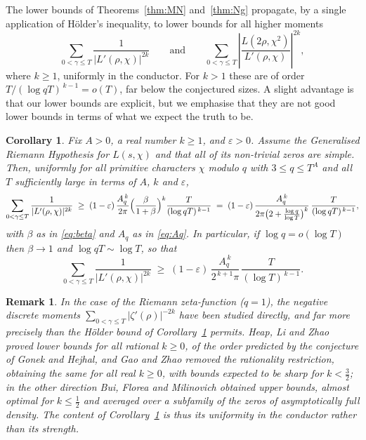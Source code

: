 \documentclass[10pt,a4paper]{amsart}
\newtheorem{corollary}[theorem]{Corollary}
\newtheorem*{remark}{Remark}
\numberwithin{equation}{section}
\begin{document}
The lower bounds of Theorems~\ref{thm:MN} and~\ref{thm:Ng} propagate, by a
single application of H\"older's inequality, to lower bounds for all higher
moments
\[
  \sum_{0<\gamma\le T}\frac{1}{|L'(\rho,\chi)|^{2k}}
  \qquad\text{and}\qquad
  \sum_{0<\gamma\le T}\left|\frac{L(2\rho,\chi^2)}{L'(\rho,\chi)}\right|^{2k},
\]
where $k \geq 1$, uniformly in the conductor. For $k>1$ these are of order $T/(\log qT)^{\,k-1}=o(T)$, far below the conjectured sizes. A slight advantage is that our lower bounds are explicit, but we emphasise that they are not good lower bounds in terms of what we expect the truth to be.

\begin{corollary}\label{cor:MN-higher}
Fix $A>0$, a real number $k\ge1$, and $\varepsilon>0$. Assume the Generalised
Riemann Hypothesis for $L(s,\chi)$ and that all of its non-trivial zeros are
simple. Then, uniformly for all primitive characters $\chi$ modulo $q$ with
$3\le q\le T^{A}$ and all $T$ sufficiently large in terms of $A$, $k$ and
$\varepsilon$,
\[
  \sum_{0<\gamma\le T}\frac{1}{|L'(\rho,\chi)|^{2k}}
  \;\ge\;(1-\varepsilon)\,\frac{A_q^{\,k}}{2\pi}
  \Bigl(\frac{\beta}{1+\beta}\Bigr)^{k}\frac{T}{(\log qT)^{\,k-1}}
  \;=\;(1-\varepsilon)\,\frac{A_q^{\,k}}{2\pi\bigl(2+\frac{\log q}{\log T}\bigr)^{k}}
  \,\frac{T}{(\log qT)^{\,k-1}},
\]
with $\beta$ as in \eqref{eq:beta} and $A_q$ as in \eqref{eq:Aq}. In particular,
if $\log q=o(\log T)$ then $\beta\to1$ and $\log qT\sim\log T$, so that
\[
  \sum_{0<\gamma\le T}\frac{1}{|L'(\rho,\chi)|^{2k}}
  \;\ge\;(1-\varepsilon)\,\frac{A_q^{\,k}}{2^{\,k+1}\pi}\,\frac{T}{(\log T)^{\,k-1}} .
\]
\end{corollary}

\begin{remark}
In the case of the Riemann zeta-function ($q=1$), the negative discrete moments $\sum_{0<\gamma\le T}|\zeta'(\rho)|^{-2k}$ have been studied directly, and far more precisely than the H\"older bound of Corollary~\ref{cor:MN-higher} permits. Heap, Li and Zhao \cite{HLZ} proved lower bounds for all rational $k\ge0$, of the order predicted by the conjecture of Gonek and Hejhal, and Gao and Zhao \cite{GaoZhao} removed the rationality restriction, obtaining the same for all real $k\ge0$, with bounds expected to be sharp for $k<\tfrac32$; in the other direction Bui, Florea and Milinovich \cite{BFM} obtained upper bounds, almost optimal for $k\le\tfrac12$ and averaged over a subfamily of the zeros of asymptotically full density. The content of Corollary~\ref{cor:MN-higher} is thus its uniformity in the conductor rather than its strength.
\end{remark}
\end{document}

